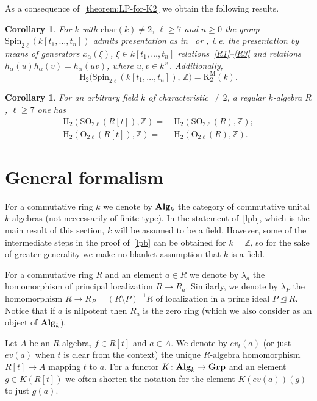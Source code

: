 \documentclass[oneside, 11pt]{amsart} \pdfoutput=1
\newcommand{\K}{{\mathrm{K}}}
\numberwithin{equation}{section}
\newtheorem{corollary}[lemma]{Corollary}
\theoremstyle{definition}
\newcommand{\ZZ}{\mathbb{Z}}
\newcommand{\catname}[1]{{\normalfont\textbf{#1}}} %
\begin{document}
As a consequence of~\cref{theorem:LP-for-K2} we obtain the following results.
\begin{corollary} \label{cor:various-facts}
For $k$ with $\mathrm{char}(k)\neq 2$, $\ell \geq 7$ and $n\geq 0$ the group $\mathrm{Spin}_{2\ell}(k[t_1,\ldots, t_n])$ admits presentation as in~\cite[\S~6]{St67} or \cite[\S~5]{Ma69}, i.\,e. the presentation by means of generators $x_\alpha(\xi)$, $\xi \in k[t_1,\ldots, t_n]$ relations~\eqref{R1}--\eqref{R3} and relations $h_\alpha(u)h_\alpha(v) = h_\alpha(uv)$, where $u, v\in k^\times$. Additionally,
\[\mathrm H_2(\mathrm{Spin}_{2\ell}(k[t_1,\ldots,t_n]),\,\mathbb Z\big) = \K^\mathrm{M}_2(k).\]
\end{corollary}
\begin{corollary} \label{cor:H_2-O}
 For an arbitrary field $k$ of characteristic $\neq 2$, a regular $k$-algebra $R$, $\ell \geq 7$ one has
 \begin{align}
  \mathrm H_2 (\mathrm{SO}_{2\ell}(R[t]), \ZZ) =&\ \mathrm H_2 (\mathrm{SO}_{2\ell}(R), \ZZ); \label{eq:H_2-SO} \\
  \mathrm H_2 (\mathrm{O}_{2\ell}(R[t]), \ZZ) =&\ \mathrm H_2 (\mathrm{O}_{2\ell}(R), \ZZ). \label{eq:H_2-O}
 \end{align}
\end{corollary}

\section{General formalism}
For a commutative ring $k$ we denote by $\catname{Alg}_k$ the category of commutative unital $k$-algebras (not neccessarily of finite type). In the statement of~\cref{lpb}, which is the main result of this section, $k$ will be assumed to be a field. However, some of the intermediate steps in the proof of~\cref{lpb} can be obtained for $k=\ZZ$, so for the sake of greater generality we make no blanket assumption that $k$ is a field.  

For a commutative ring $R$ and an element $a\in R$ we denote by $\lambda_a$ the homomorphism of principal localization $R \to R_a$. Similarly, we denote by $\lambda_P$ the homomorphism $R \to R_P = (R\setminus P)^{-1}R$ of localization in a prime ideal $P \trianglelefteq R$. Notice that if $a$ is nilpotent then $R_a$ is the zero ring (which we also consider as an object of $\catname{Alg}_k$). 

Let $A$ be an $R$-algebra, $f\in R[t]$ and $a \in A$. We denote by $ev_t(a)$ (or just $ev(a)$ when $t$ is clear from the context) the unique $R$-algebra homomorphism $R[t] \to A$ mapping $t$ to $a$. For a functor $K \colon \catname{Alg}_k \to \catname{Grp}$ and an element $g \in K(R[t])$ we often shorten the notation for the element $K(ev(a))(g)$ to just $g(a)$.
\end{document}

